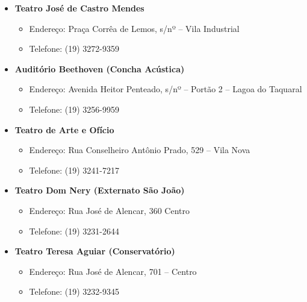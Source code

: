 \begin{itemize}
\item  \textbf{Teatro José de Castro Mendes}
\begin{itemize}
\item  Endereço: Praça Corrêa de Lemos, s/nº -- Vila Industrial
\item  Telefone: (19) 3272-9359
\end{itemize}
\end{itemize}

\begin{itemize}
\item  \textbf{Auditório Beethoven (Concha Acústica)}
\begin{itemize}
\item  Endereço: Avenida Heitor Penteado, s/nº -- Portão 2 -- Lagoa do Taquaral
\item  Telefone: (19) 3256-9959
\end{itemize}
\end{itemize}

\begin{itemize}
\item  \textbf{Teatro de Arte e Ofício}
\begin{itemize}
\item  Endereço: Rua Conselheiro Antônio Prado, 529 -- Vila Nova
\item  Telefone: (19) 3241-7217
\end{itemize}
\end{itemize}

\begin{itemize}
\item  \textbf{Teatro Dom Nery (Externato São João)}
\begin{itemize}
\item  Endereço: Rua José de Alencar, 360  Centro
\item  Telefone: (19) 3231-2644
\end{itemize}
\end{itemize}

\begin{itemize}
\item  \textbf{Teatro Teresa Aguiar (Conservatório)}
\begin{itemize}
\item  Endereço: Rua José de Alencar, 701 -- Centro
\item  Telefone: (19) 3232-9345
\end{itemize}
\end{itemize}

